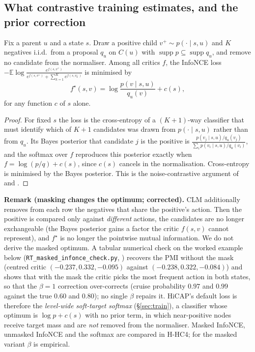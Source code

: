 \subsection{What contrastive training estimates, and the prior correction}
\begin{proposition}\label{prop:infonce}
Fix a parent $u$ and a state $s$. Draw a positive child $v^+\sim p(\cdot\mid s,u)$ and $K$ negatives
i.i.d.\ from a proposal $q_u$ on $C(u)$ with $\operatorname{supp}p\subseteq\operatorname{supp}q_u$, and remove no candidate from the normaliser. Among all critics $f$, the InfoNCE loss
$-\mathbb E\log\frac{e^{f(s,v^+)}}{e^{f(s,v^+)}+\sum_{k=1}^{K}e^{f(s,v^-_k)}}$
is minimised by
\begin{equation}
f^\star(s,v)=\log\frac{p(v\mid s,u)}{q_u(v)}+c(s),\label{eq:pmi}
\end{equation}
for any function $c$ of $s$ alone.
\end{proposition}
\begin{proof}
For fixed $s$ the loss is the cross-entropy of a $(K{+}1)$-way classifier that must identify which of
$K{+}1$ candidates was drawn from $p(\cdot\mid s,u)$ rather than from $q_u$. Its Bayes posterior that candidate $j$ is the positive is
$\frac{p(v_j\mid s,u)/q_u(v_j)}{\sum_i p(v_i\mid s,u)/q_u(v_i)}$, and the softmax over $f$ reproduces this posterior
exactly when $f=\log(p/q)+c(s)$, since $c(s)$ cancels in the normalisation. Cross-entropy is minimised
by the Bayes posterior. This is the noise-contrastive argument of \citet{oord2018cpc} and \citet{poole2019variational}.\qedhere
\end{proof}
\noindent\textbf{Remark (masking changes the optimum; corrected).} CLM additionally removes from each row the negatives that share the positive's action. Then the positive is compared only against \emph{different} actions, the candidates are no longer exchangeable (the Bayes posterior gains a factor the critic $f(s,v)$ cannot represent), and $f^\star$ is no longer the pointwise mutual information. We do not derive the masked optimum. A tabular numerical check on the worked example below (\texttt{RT\_masked\_infonce\_check.py}, \evM) recovers the PMI without the mask (centred critic $(-0.237,0.332,-0.095)$ against $(-0.238,0.322,-0.084)$) and shows that with the mask the critic picks the most frequent action in both states, so that the $\beta=1$ correction over-corrects (cruise probability $0.97$ and $0.99$ against the true $0.60$ and $0.80$); no single $\beta$ repairs it. HiCAP's default loss is therefore the \emph{level-wide soft-target softmax} (\S\ref{sec:train}), a classifier whose optimum is $\log p+c(s)$ with no prior term, in which near-positive nodes receive target mass and are \emph{not} removed from the normaliser. Masked InfoNCE, unmasked InfoNCE and the softmax are compared in H-HC4; for the masked variant $\beta$ is empirical.

